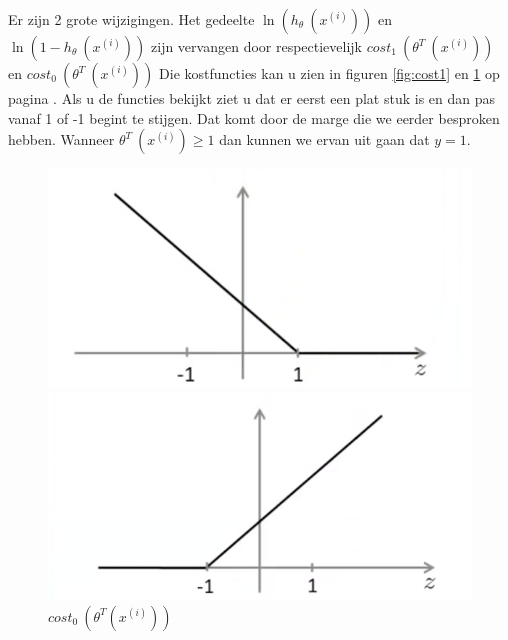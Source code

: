 Er zijn 2 grote wijzigingen. Het gedeelte $\ln(h_{\theta}\:(x^{(i)}))$ en $\ln(1-h_{\theta}\:(x^{(i)}))$ zijn vervangen door respectievelijk $cost_{1}\:(\theta^{T}\:(x^{(i)}))$ en $cost_{0}\:(\theta^{T}\:(x^{(i)})) $ 
Die kostfuncties kan u zien in figuren \ref{fig:cost1} en \ref{fig:cost0} op pagina \pageref{fig:cost1}. Als u de functies bekijkt ziet u dat er eerst een plat stuk is en dan pas vanaf 1 of -1 begint te stijgen. Dat komt door de marge die we eerder besproken hebben. Wanneer  $\theta^{T}\:(x^{(i)}) \geq 1$ dan kunnen we ervan uit gaan dat $y=1$.
\begin{figure}
	\centering
	\begin{minipage}{.5\textwidth}
		\centering
		\includegraphics[width=1\linewidth]{img/costEen}
		\caption{$cost_{1}\:(\theta^{T}(x^{(i)}))$  \autocite{cursusAndrewNg} }
		\label{fig:cost1}
	\end{minipage}%
	\begin{minipage}{.5\textwidth}
		\centering
		\includegraphics[width=1\linewidth]{img/costNul}
		\caption{$cost_{0}\:(\theta^{T}(x^{(i)})) $  \autocite{cursusAndrewNg} }
		\label{fig:cost0}
	\end{minipage}
\end{figure}


